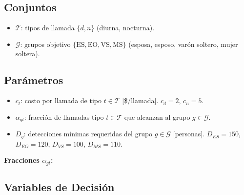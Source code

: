 \documentclass[12pt,a4paper]{article}
\begin{document}
\subsection{Conjuntos}

\begin{conjbox}
\begin{itemize}[leftmargin=1.5em]
  \item $\mathcal{T}$: tipos de llamada $\{d, n\}$ (diurna, nocturna).
  \item $\mathcal{G}$: grupos objetivo $\{\text{ES}, \text{EO}, \text{VS}, \text{MS}\}$ (esposa, esposo, varón soltero, mujer soltera).
\end{itemize}
\end{conjbox}

\subsection{Parámetros}

\begin{parambox}
\begin{itemize}[leftmargin=1.5em]
  \item $c_t$: costo por llamada de tipo $t \in \mathcal{T}$ [\$/llamada]. $c_d = 2$, $c_n = 5$.
  \item $\alpha_{gt}$: fracción de llamadas tipo $t \in \mathcal{T}$ que alcanzan al grupo $g \in \mathcal{G}$.
  \item $D_g$: detecciones mínimas requeridas del grupo $g \in \mathcal{G}$ [personas]. $D_{ES}=150$, $D_{EO}=120$, $D_{VS}=100$, $D_{MS}=110$.
\end{itemize}

\medskip
\textbf{Fracciones $\alpha_{gt}$:}\par\smallskip
{}
\end{parambox}

\subsection{Variables de Decisión}
\end{document}

